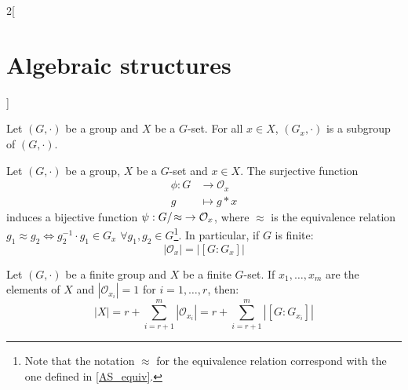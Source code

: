 \documentclass[../../../main.tex]{subfiles}
\begin{document}
\begin{multicols}{2}[\section{Algebraic structures}]
\begin{definition}
    \end{definition}
    \begin{prop}
        Let $(G,\cdot)$ be a group and $X$ be a $G$-set. For all $x\in X$, $(G_x,\cdot)$ is a subgroup of $(G,\cdot)$.
    \end{prop}
    \begin{theorem}
        Let $(G,\cdot)$ be a group, $X$ be a $G$-set and $x\in X$. The surjective function
        \begin{align*}
            \phi:G & \longrightarrow \mathcal{O}_x \\
            g      & \longmapsto g*x
        \end{align*}
        induces a bijective function $\psi:\quot{G}{\!\approx}\;\rightarrow\mathcal{O}_x$, where $\approx$ is the equivalence relation $g_1\approx g_2\iff g_2^{-1}\cdot g_1\in G_x$ $\forall g_1,g_2\in G$\footnote{Note that the notation $\approx$ for the equivalence relation correspond with the one defined in \cref{AS_equiv}.}. In particular, if $G$ is finite: $$|\mathcal{O}_x|=|[G:G_x]|$$
    \end{theorem}
    \begin{corollary}
        Let $(G,\cdot)$ be a finite group and $X$ be a finite $G$-set. If $x_1,\ldots,x_m$ are the elements of $X$ and $|\mathcal{O}_{x_i}|=1$ for $i=1,\ldots,r$, then:
        \begin{equation}
            |X|=r+\sum_{i=r+1}^m|\mathcal{O}_{x_i}|=r+\sum_{i=r+1}^m|[G:G_{x_i}]|
            \label{AS_obritsformula}
        \end{equation}
    \end{corollary}

\end{multicols}
\end{document}
